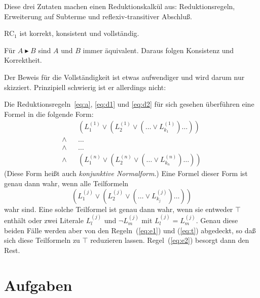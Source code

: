 Diese drei Zutaten machen einen Reduktionskalkül aus:
Reduktionsregeln, Erweiterung auf Subterme und reflexiv-transitiver
Abschluß.

\begin{satz}
  RC$_1$ ist korrekt, konsistent und vollständig.
\end{satz}

\begin{beweis}

Für $A\blacktriangleright B$ sind $A$ und $B$ immer
äquivalent.  Daraus folgen Konsistenz und Korrektheit.

Der Beweis für die Vollständigkeit ist etwas aufwendiger und wird
darum nur skizziert.  Prinzipiell schwierig ist er allerdings nicht:

Die Reduktionsregeln~\ref{eq:a}, \ref{eq:d1} und \ref{eq:d2} für sich
gesehen überführen eine Formel in die folgende Form:
%
\begin{eqnarray*}
  &&(L_1^{(1)}\vee (L_2^{(1)} \vee(\ldots \vee L_{k_1}^{(1)})\ldots))\\
  \wedge&&\ldots\\
  \wedge&&\ldots\\
\wedge&&
  (L_1^{(n)}\vee (L_2^{(n)} \vee(\ldots \vee L_{k_n}^{(n)})\ldots))
\end{eqnarray*}
%
(Diese Form heißt auch \textit{konjunktive Normalform}.)  Eine Formel
dieser Form ist genau dann wahr, wenn alle Teilformeln
%
\begin{displaymath}
(L_1^{(j)}\vee (L_2^{(j)} \vee(\ldots \vee L_{k_j}^{(j)})\ldots))
\end{displaymath}
%
wahr sind.  Eine solche Teilformel ist genau dann wahr, wenn sie
entweder $\top$ enthält oder zwei Literale $L_l^{(j)}$ und $\neg L_m^{(j)}$
mit $L_l^{(j)} = L_m^{(j)}$.  Genau diese beiden Fälle werden
aber von den Regeln~(\ref{eq:e1}) und (\ref{eq:t}) abgedeckt, so daß sich
diese Teilformeln zu $\top$ reduzieren lassen.  Regel~(\ref{eq:e2})
besorgt dann den Rest.
\end{beweis}
                                

\section*{Aufgaben}

